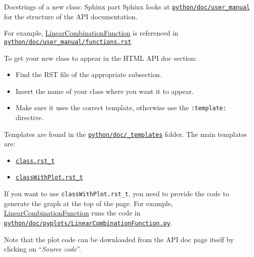 \documentclass[8pt, handout]{beamer}
\begin{document}
\begin{frame}{Docstrings of a new class: Sphinx part}
Sphinx looks at \href{https://github.com/openturns/openturns/tree/master/python/doc/user_manual}{\texttt{python/\alert{doc}/user\_manual}} for the structure of the API documentation.

For example, \href{https://openturns.github.io/openturns/master/user_manual/_generated/openturns.LinearCombinationFunction.html}{\alert{LinearCombinationFunction}} is referenced in \href{https://github.com/openturns/openturns/blob/master/python/doc/user_manual/functions.rst}{\texttt{python/doc/user\_manual/functions.rst}}

To get your new class to appear in the \alert{HTML API doc} section:

\begin{itemize}
    \item Find the \alert{RST file} of the appropriate subsection.
    \item \alert{Insert the name} of your class where you want it to appear.
    \item Make sure it uses the correct \alert{template}, otherwise use the \texttt{:template:} directive.
\end{itemize}

Templates are found in the \href{https://github.com/openturns/openturns/tree/master/python/doc/_templates}{\texttt{python/doc/\_templates}} folder. The main templates are:

\begin{itemize}
    \item \href{https://github.com/openturns/openturns/blob/master/python/doc/_templates/class.rst_t}{\alert{\texttt{class.rst\_t}}}
    \item \href{https://github.com/openturns/openturns/blob/master/python/doc/_templates/classWithPlot.rst_t}{\alert{\texttt{classWithPlot.rst\_t}}}
\end{itemize}

If you want to use \texttt{classWithPlot.rst\_t}, you need to provide the code to generate the graph at the top of the page. For example, \href{https://openturns.github.io/openturns/master/user_manual/_generated/openturns.LinearCombinationFunction.html}{\alert{LinearCombinationFunction}} runs the code in
\href{https://github.com/openturns/openturns/blob/master/python/doc/pyplots/LinearCombinationFunction.py}{\texttt{\alert{python/doc/pyplots}/LinearCombinationFunction.py}}.

Note that the plot code can be downloaded from the API doc page itself by clicking on ``\emph{Source code}''.
\end{frame}
\end{document}
